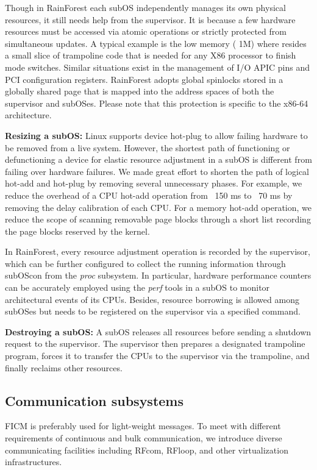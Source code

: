 \documentclass[pageno]{jpaper}
\begin{document}
Though in RainForest each subOS independently manages its own physical resources, it still needs help from the supervisor. It is because a few hardware resources must be accessed via atomic operations or strictly protected from simultaneous updates. A typical example is the low memory ( 1M) where resides a small slice of trampoline code that is needed for any X86 processor to finish mode switches.
Similar situations exist in the management of I/O APIC pins and PCI configuration registers. RainForest adopts global spinlocks stored in a globally shared page that is mapped into the address spaces of both the supervisor and subOSes.
Please note that this protection is specific to the x86-64 architecture.



\textbf{Resizing a subOS:}
Linux supports device hot-plug to allow failing hardware to be removed from a live system. However,  the shortest path of functioning or defunctioning a device for elastic resource adjustment in a subOS  is different from failing over hardware failures. We made great effort to shorten the path of logical hot-add and
hot-plug by removing several unnecessary phases. For example, we reduce the overhead of a CPU hot-add operation from ~150 ms to ~70 ms by removing the delay calibration of each CPU. For a memory hot-add operation, we reduce the scope of scanning removable page blocks through a short list recording the page blocks reserved by the kernel.

In RainForest, every resource adjustment operation is recorded by the supervisor, which can be further configured to collect the running information through subOScon from the \emph{proc} subsystem. In particular, hardware performance counters can be accurately employed using the \emph{perf} tools in a subOS to monitor architectural events of its CPUs. Besides, resource borrowing is allowed among subOSes but needs to be registered on the supervisor via a specified command.


\textbf{Destroying a subOS:} A subOS releases all resources before sending a shutdown request to the supervisor. The supervisor then prepares a designated trampoline program, forces it to transfer the CPUs to the supervisor via the trampoline, and finally reclaims other resources.





\subsection{Communication subsystems}\label{communication}
FICM is preferably used for light-weight messages.
To meet with different requirements of continuous and bulk communication, we introduce diverse communicating facilities including RFcom, RFloop, and other virtualization infrastructures.
\end{document}
